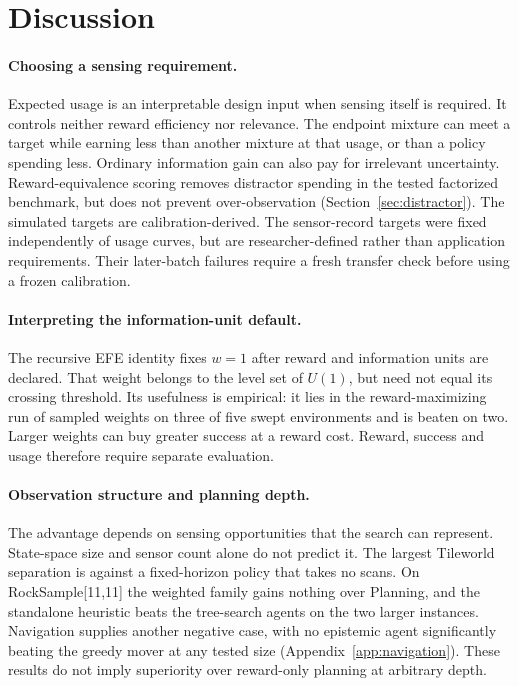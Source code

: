\documentclass[manuscript, screen, review]{jair}
\begin{document}
\section{Discussion}
\label{sec:discussion}

\paragraph{Choosing a sensing requirement.}
Expected usage is an interpretable design input when sensing itself is required. It controls neither reward efficiency nor relevance. The endpoint mixture can meet a target while earning less than another mixture at that usage, or than a policy spending less. Ordinary information gain can also pay for irrelevant uncertainty. Reward-equivalence scoring removes distractor spending in the tested factorized benchmark, but does not prevent over-observation (Section~\ref{sec:distractor}). The simulated targets are calibration-derived. The sensor-record targets were fixed independently of usage curves, but are researcher-defined rather than application requirements. Their later-batch failures require a fresh transfer check before using a frozen calibration.

\paragraph{Interpreting the information-unit default.}
The recursive EFE identity fixes $w=1$ after reward and information units are declared. That weight belongs to the level set of $U(1)$, but need not equal its crossing threshold. Its usefulness is empirical: it lies in the reward-maximizing run of sampled weights on three of five swept environments and is beaten on two. Larger weights can buy greater success at a reward cost. Reward, success and usage therefore require separate evaluation.

\paragraph{Observation structure and planning depth.}
The advantage depends on sensing opportunities that the search can represent. State-space size and sensor count alone do not predict it. The largest Tileworld separation is against a fixed-horizon policy that takes no scans. On RockSample[11,11] the weighted family gains nothing over Planning, and the standalone heuristic beats the tree-search agents on the two larger instances. Navigation supplies another negative case, with no epistemic agent significantly beating the greedy mover at any tested size (Appendix~\ref{app:navigation}). These results do not imply superiority over reward-only planning at arbitrary depth.
\end{document}
